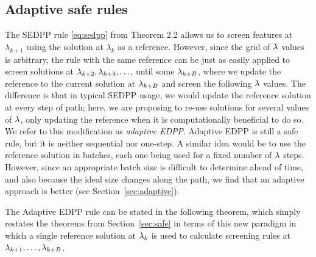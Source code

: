 \subsection{Adaptive safe rules}

The SEDPP rule \eqref{eq:sedpp} from Theorem 2.2 allows us to screen features at $\lambda_{k+1}$ using the solution at $\lambda_k$ as a reference. However, since the grid of $\lambda$ values is arbitrary, the rule with the same reference can be just as easily applied to screen solutions at $\lambda_{k+2}, \lambda_{k+3}, \ldots$, until some $\lambda_{k+B}$, where we update the reference to the current solution at $\lambda_{k+B}$ and screen the following $\lambda$ values.  The difference is that in typical SEDPP usage, we would update the reference solution at every step of path; here, we are proposing to re-use solutions for several values of $\lambda$, only updating the reference when it is computationally beneficial to do so.  We refer to this modification as \emph{adaptive EDPP}.  Adaptive EDPP is still a safe rule, but it is neither sequential nor one-step.   A similar idea would be to use the reference solution in batches, each one being used for a fixed number of $\lambda$ steps.  However, since an appropriate batch size is difficult to determine ahead of time, and also because the ideal size changes along the path, we find that an adaptive approach is better (see Section~\ref{sec:adaptive}).

The Adaptive EDPP rule can be stated in the following theorem, which simply restates the theorems from Section~\ref{sec:safe} in terms of this new paradigm in which a single reference solution at $\lambda_k$ is used to calculate screening rules at $\lambda_{k+1}, \ldots, \lambda_{k+B}$.

